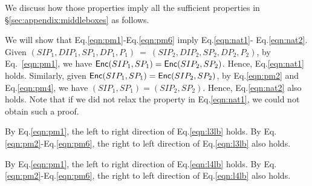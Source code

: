 We discuss how those properties imply all the sufficient properties in \S\ref{sec:appendix:middleboxes} as follows.

We will show that Eq.\eqref{eqn:pm1}-Eq.\eqref{eqn:pm6} imply Eq.\eqref{eqn:nat1}-
Eq.\eqref{eqn:nat2}. Given $(SIP_1, DIP_1, SP_1, DP_1, P_1)\ =\ (SIP_2, DIP_2, SP_2, DP_2, P_2)$, 
by Eq.~\eqref{eqn:pm1},
we have $\mathsf{Enc}(SIP_1, SP_1) = \mathsf{Enc}(SIP_2, SP_2)$. Hence, Eq.\eqref{eqn:nat1} holds. Similarly, 
given $\mathsf{Enc}(SIP_1, SP_1) = \mathsf{Enc}(SIP_2, SP_2)$, by Eq.\eqref{eqn:pm2} and Eq.\eqref{eqn:pm4}, 
we have $(SIP_1, SP_1) = (SIP_2, SP_2)$. Hence, Eq.\eqref{eqn:nat2} also holds. Note that if
we did not relax the property in Eq.\eqref{eqn:nat1}, we could not obtain such a proof.

By Eq.\eqref{eqn:pm1}, the left to right direction of 
Eq.\eqref{eqn:l3lb} holds. By Eq.\eqref{eqn:pm2}-Eq.\eqref{eqn:pm6}, the right to left 
direction of Eq.\eqref{eqn:l3lb} also holds.

By Eq.\eqref{eqn:pm1}, the left to right direction of 
Eq.\eqref{eqn:l4lb} holds. By Eq.\eqref{eqn:pm2}-Eq.\eqref{eqn:pm6}, the right to left 
direction of Eq.\eqref{eqn:l4lb} also holds.




